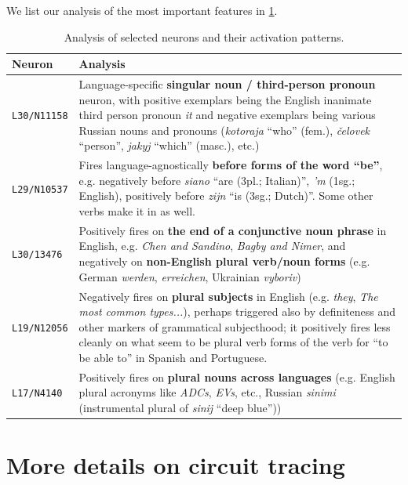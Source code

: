 \documentclass{article}
\theoremstyle{plain}
\theoremstyle{definition}
\theoremstyle{remark}
\begin{document}
We list our analysis of the most important features in \cref{tab:neuron_analysis}.

\begin{table}[!h]
\centering
\small
\begin{tabular}{lp{}}
\toprule
\textbf{Neuron} & \textbf{Analysis} \\
\midrule
\texttt{L30/N11158} & Language-specific \textbf{singular noun / third-person pronoun} neuron, with positive exemplars being the English inanimate third person pronoun \textit{it} and negative exemplars being various Russian nouns and pronouns (\textit{kotoraja} ``who'' (fem.), \textit{čelovek} ``person'', \textit{jakyj} ``which'' (masc.), etc.) \\
\addlinespace
\texttt{L29/N10537} & Fires language-agnostically \textbf{before forms of the word ``be''}, e.g. negatively before \textit{siano} ``are (3pl.; Italian)'', \textit{'m} (1sg.; English), positively before \textit{zijn} ``is (3sg.; Dutch)''. Some other verbs make it in as well. \\
\addlinespace
\texttt{L30/13476} & Positively fires on \textbf{the end of a conjunctive noun phrase} in English, e.g. \textit{Chen and Sandino}, \textit{Bagby and Nimer}, and negatively on \textbf{non-English plural verb/noun forms} (e.g. German \textit{werden}, \textit{erreichen}, Ukrainian \textit{vyboriv}) \\
\midrule
\texttt{L19/N12056} & Negatively fires on \textbf{plural subjects} in English (e.g. \textit{they}, \textit{The most common types...}), perhaps triggered also by definiteness and other markers of grammatical subjecthood; it positively fires less cleanly on what seem to be plural verb forms of the verb for ``to be able to'' in Spanish and Portuguese. \\
\addlinespace
\texttt{L17/N4140} & Positively fires on \textbf{plural nouns across languages} (e.g. English plural acronyms like \textit{ADCs}, \textit{EVs}, etc., Russian \textit{sinimi} (instrumental plural of \textit{sinij} ``deep blue'')) \\
\bottomrule
\end{tabular}
\caption{Analysis of selected neurons and their activation patterns.}
\label{tab:neuron_analysis}
\end{table}



\newpage
\section{More details on circuit tracing}
\end{document}
